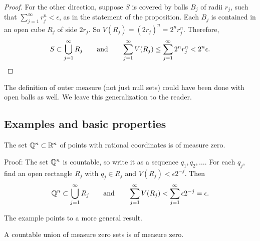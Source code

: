 \begin{proof}
For the other direction, suppose $S$ is covered by balls $B_j$
of radii $r_j$, such that $\sum_{j=1}^\infty r_j^n < \epsilon$,
as in the statement of the proposition.
Each $B_j$ is contained in an open cube $R_j$ of side $2r_j$.
So $V(R_j) = {(2 r_j)}^n = 2^n r_j^n$.  Therefore,
\begin{equation*}
S \subset \bigcup_{j=1}^\infty R_j \qquad \text{and} \qquad
\sum_{j=1}^\infty V(R_j)
\leq
\sum_{j=1}^\infty 2^n r_j^n < 2^n \epsilon. \qedhere
\end{equation*}
\end{proof}

The definition of outer measure (not just null sets)
could have been done with open balls
as well.  We leave this generalization to the reader.

\subsection{Examples and basic properties}

\begin{example}
The set ${\mathbb{Q}}^n \subset {\mathbb{R}}^n$ of points with rational coordinates
is of measure zero.

Proof:
The set ${\mathbb{Q}}^n$ is countable, so write it
as a sequence $q_1,q_2,\ldots$.  For each $q_j$, find an open rectangle
$R_j$ with $q_j \in R_j$ and $V(R_j) < \epsilon 2^{-j}$.  Then
\begin{equation*}
{\mathbb{Q}}^n \subset \bigcup_{j=1}^\infty R_j \qquad \text{and} \qquad
\sum_{j=1}^\infty V(R_j) <
\sum_{j=1}^\infty \epsilon 2^{-j} = \epsilon .
\end{equation*}
\end{example}

The example points to a more general result.

\begin{prop}
A countable union of measure zero sets is of measure zero.
\end{prop}

